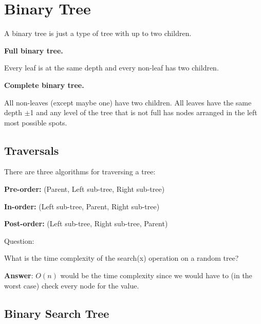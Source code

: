 \documentclass[11pt,a4paper,english]{paper}
\begin{document}
\bigskip


\section{Binary Tree}

A binary tree is just a type of tree with up to two children.

\bigskip

\noindent\textbf{Full binary tree.}

Every leaf is at the same depth and every non-leaf has two children.

\bigskip
\noindent\textbf{Complete binary tree.}

All non-leaves (except maybe one) have two children. All leaves have the same depth $\pm$1 and any level of the tree that is not full has nodes arranged in the left most possible spots.

\subsection{Traversals}

There are three algorithms for traversing a tree:

\bigskip

\begin{itemize} {

    \item \textbf{Pre-order:} (Parent, Left sub-tree, Right sub-tree)
    \item \textbf{In-order:} (Left sub-tree, Parent, Right sub-tree)
    \item \textbf{Post-order:} (Left sub-tree, Right sub-tree, Parent)

}\end{itemize}

\bigskip

\begin{gbox}{Question:} {

  What is the time complexity of the search(x) operation on a random tree?

  \bigskip\textbf{Answer}: $O(n)$ would be the time complexity since we would have to (in the worst case) check every node for the value.


}\end{gbox}

\subsection{Binary Search Tree}
\end{document}
